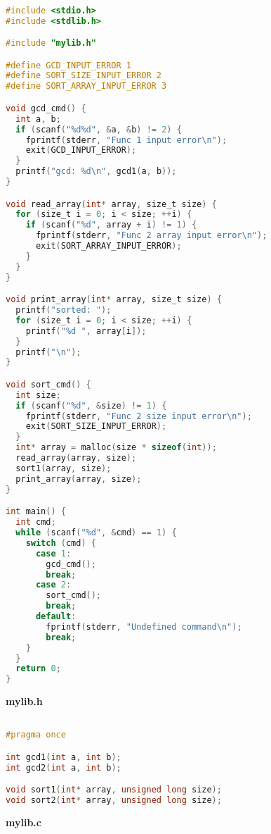 \begin{lstlisting}[language=C]

#include <stdio.h>
#include <stdlib.h>

#include "mylib.h"

#define GCD_INPUT_ERROR 1
#define SORT_SIZE_INPUT_ERROR 2
#define SORT_ARRAY_INPUT_ERROR 3

void gcd_cmd() {
  int a, b;
  if (scanf("%d%d", &a, &b) != 2) {
    fprintf(stderr, "Func 1 input error\n");
    exit(GCD_INPUT_ERROR);
  }
  printf("gcd: %d\n", gcd1(a, b));
}

void read_array(int* array, size_t size) {
  for (size_t i = 0; i < size; ++i) {
    if (scanf("%d", array + i) != 1) {
      fprintf(stderr, "Func 2 array input error\n");
      exit(SORT_ARRAY_INPUT_ERROR);
    }
  }
}

void print_array(int* array, size_t size) {
  printf("sorted: ");
  for (size_t i = 0; i < size; ++i) {
    printf("%d ", array[i]);
  }
  printf("\n");
}

void sort_cmd() {
  int size;
  if (scanf("%d", &size) != 1) {
    fprintf(stderr, "Func 2 size input error\n");
    exit(SORT_SIZE_INPUT_ERROR);
  }
  int* array = malloc(size * sizeof(int));
  read_array(array, size);
  sort1(array, size);
  print_array(array, size);
}

int main() {
  int cmd;
  while (scanf("%d", &cmd) == 1) {
    switch (cmd) {
      case 1:
        gcd_cmd();
        break;
      case 2:
        sort_cmd();
        break;
      default:
        fprintf(stderr, "Undefined command\n");
        break;
    }
  }
  return 0;
}

\end{lstlisting}

\textbf{mylib.h}

\begin{lstlisting}[language=C]

#pragma once

int gcd1(int a, int b);
int gcd2(int a, int b);

void sort1(int* array, unsigned long size);
void sort2(int* array, unsigned long size);

\end{lstlisting}

\textbf{mylib.c}

